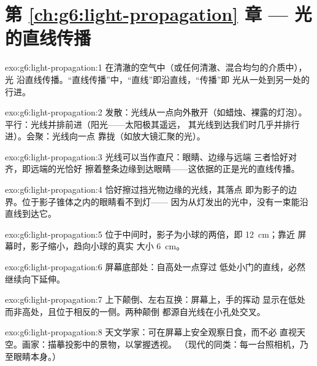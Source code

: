 \section*{第 \ref{ch:g6:light-propagation} 章 --- 光的直线传播}

\begin{solution}{exo:g6:light-propagation:1}
在清澈的空气中（或任何清澈、混合均匀的介质中），光
沿直线传播。“直线传播”中，“直线”即沿直线，“传播”即
光从一处到另一处的行进。
\end{solution}

\begin{solution}{exo:g6:light-propagation:2}
发散：光线从一点向外散开（如蜡烛、裸露的灯泡）。
平行：光线并排前进（阳光——太阳极其遥远，
其光线到达我们时几乎并排行进）。会聚：光线向一点
靠拢（如放大镜汇聚的光）。
\end{solution}

\begin{solution}{exo:g6:light-propagation:3}
光线可以当作直尺：眼睛、边缘与远端
三者恰好对齐，即远端的光恰好
擦着整条边缘到达眼睛——这依据的正是光的直线传播。
\end{solution}

\begin{solution}{exo:g6:light-propagation:4}
恰好擦过挡光物边缘的光线，其落点
即为影子的边界。位于影子锥体之内的眼睛看不到灯——
因为从灯发出的光中，没有一束能沿直线到达它。
\end{solution}

\begin{solution}{exo:g6:light-propagation:5}
位于中间时，影子为小球的两倍，即 \qty{12}{cm}；靠近
屏幕时，影子缩小，趋向小球的真实
大小 \qty{6}{cm}。
\end{solution}

\begin{solution}{exo:g6:light-propagation:6}
屏幕底部处：自高处一点穿过
低处小门的直线，必然继续向下延伸。
\end{solution}

\begin{solution}{exo:g6:light-propagation:7}
上下颠倒、左右互换：屏幕上，手的挥动
显示在低处而非高处，且位于相反的一侧。两种颠倒
都源自光线在小孔处交叉。
\end{solution}

\begin{solution}{exo:g6:light-propagation:8}
天文学家：可在屏幕上安全观察日食，而不必
直视天空。画家：描摹投影中的景物，以掌握透视。
（现代的同类：每一台照相机，乃至眼睛本身。）
\end{solution}


